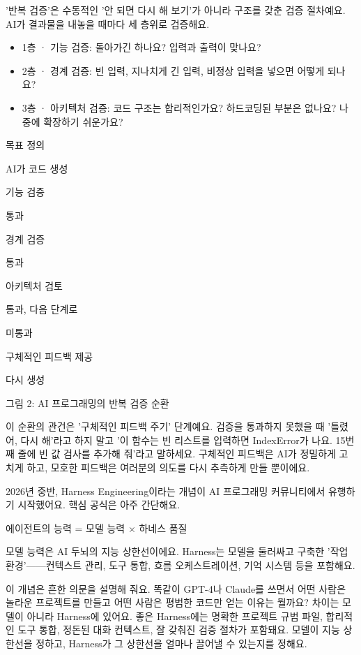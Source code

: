 '반복 검증'은 수동적인 '안 되면 다시 해 보기'가 아니라 구조를 갖춘 검증 절차예요. AI가 결과물을 내놓을 때마다 세 층위로 검증해요.

\begin{itemize}
  \item 1층 · 기능 검증: 돌아가긴 하나요? 입력과 출력이 맞나요?
  \item 2층 · 경계 검증: 빈 입력, 지나치게 긴 입력, 비정상 입력을 넣으면 어떻게 되나요?
  \item 3층 · 아키텍처 검증: 코드 구조는 합리적인가요? 하드코딩된 부분은 없나요? 나중에 확장하기 쉬운가요?
\end{itemize}

목표 정의

AI가 코드 생성

기능 검증

통과

경계 검증

통과

아키텍처 검토

통과, 다음 단계로

미통과

구체적인 피드백 제공

다시 생성

\begin{center}\small\color{gray}그림 2: AI 프로그래밍의 반복 검증 순환\end{center}

이 순환의 관건은 '구체적인 피드백 주기' 단계예요. 검증을 통과하지 못했을 때 '틀렸어, 다시 해'라고 하지 말고 '이 함수는 빈 리스트를 입력하면 IndexError가 나요. 15번째 줄에 빈 값 검사를 추가해 줘'라고 말하세요. 구체적인 피드백은 AI가 정밀하게 고치게 하고, 모호한 피드백은 여러분의 의도를 다시 추측하게 만들 뿐이에요.


2026년 중반, Harness Engineering이라는 개념이 AI 프로그래밍 커뮤니티에서 유행하기 시작했어요. 핵심 공식은 아주 간단해요.

에이전트의 능력 = 모델 능력 × 하네스 품질

모델 능력은 AI 두뇌의 지능 상한선이에요. Harness는 모델을 둘러싸고 구축한 '작업 환경'——컨텍스트 관리, 도구 통합, 흐름 오케스트레이션, 기억 시스템 등을 포함해요.

이 개념은 흔한 의문을 설명해 줘요. 똑같이 GPT-4나 Claude를 쓰면서 어떤 사람은 놀라운 프로젝트를 만들고 어떤 사람은 평범한 코드만 얻는 이유는 뭘까요? 차이는 모델이 아니라 Harness에 있어요. 좋은 Harness에는 명확한 프로젝트 규범 파일, 합리적인 도구 통합, 정돈된 대화 컨텍스트, 잘 갖춰진 검증 절차가 포함돼요. 모델이 지능 상한선을 정하고, Harness가 그 상한선을 얼마나 끌어낼 수 있는지를 정해요.

